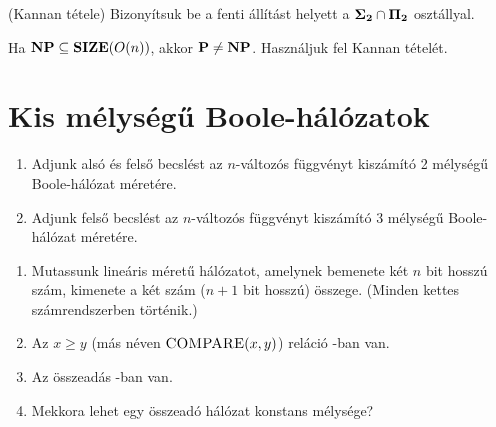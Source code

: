 \begin{Exercise}[counter={sorszam}, difficulty=2]
(Kannan tétele) Bizonyítsuk be a fenti állítást \PH helyett a $\mbox{\ensuremath{\mathbf{\Sigma_2}}} \cap \mbox{\ensuremath{\mathbf{\Pi_2}}}$ osztállyal.
\end{Exercise}


\begin{Exercise}[counter={sorszam}, difficulty=0]
\easy Ha $\mbox{\ensuremath{\mathbf{NP}}} \subseteq \mbox{\ensuremath{\mathbf{SIZE}}}(O(n))$, akkor $\mbox{\ensuremath{\mathbf{P}}} \neq \mbox{\ensuremath{\mathbf{NP}}}$. Használjuk fel Kannan tételét.
\end{Exercise}




\chapter{Kis mélységű Boole-hálózatok}

\begin{Exercise}[counter={sorszam}, difficulty=0]
\begin{enumerate}
 \item Adjunk alsó és felső becslést az $n$-változós  függvényt kiszámító 2 mélységű Boole-hálózat méretére.
 \item Adjunk felső becslést az $n$-változós  függvényt kiszámító 3 mélységű Boole-hálózat méretére.
\end{enumerate}
\end{Exercise}


\begin{Exercise}[counter={sorszam}, difficulty=0]
\begin{enumerate}
 \item Mutassunk lineáris méretű hálózatot, amelynek bemenete két
      $n$ bit hosszú szám, kimenete a két szám ($n+1$ bit hosszú) összege.
      (Minden kettes számrendszerben történik.)
 \item Az $x \geq y$ (más néven $\mbox{\sc{COMPARE}}(x,y)$) reláció \ACnull-ban van.
 \item Az összeadás \ACnull-ban van.
 \item \hard Mekkora lehet egy \ACnull összeadó hálózat konstans mélysége?
\end{enumerate}
\end{Exercise}


\begin{Exercise}[counter={sorszam}, difficulty=0]
\end{Exercise}


